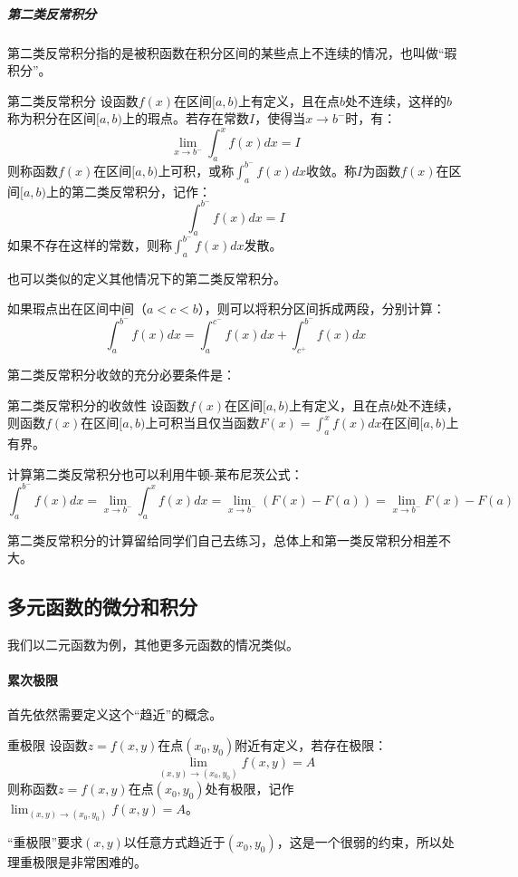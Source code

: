\subparagraph{第二类反常积分}

第二类反常积分指的是被积函数在积分区间的某些点上不连续的情况，也叫做“瑕积分”。
\begin{definition}{第二类反常积分}{}
    设函数$f(x)$在区间$[a, b)$上有定义，且在点$b$处不连续，这样的$b$称为积分在区间$[a, b)$上的瑕点。若存在常数$I$，使得当$x \to b^-$时，有：
    \begin{equation}
        \lim_{x \to b^-} \int_a^x f(x) dx = I
    \end{equation}
    则称函数$f(x)$在区间$[a, b)$上可积，或称$\int_a^{b^-} f(x) dx$收敛。称$I$为函数$f(x)$在区间$[a, b)$上的第二类反常积分，记作：
    \begin{equation}
        \int_a^{b^-} f(x) dx = I
    \end{equation}
    如果不存在这样的常数，则称$\int_a^{b^-} f(x) dx$发散。
\end{definition}
也可以类似的定义其他情况下的第二类反常积分。

如果瑕点出在区间中间（$a < c < b$），则可以将积分区间拆成两段，分别计算：
\begin{equation}
    \int_a^{b^-} f(x) dx = \int_a^{c^-} f(x) dx + \int_{c^+}^{b^-} f(x) dx
\end{equation}

第二类反常积分收敛的充分必要条件是：
\begin{theorem}{第二类反常积分的收敛性}{}
    设函数$f(x)$在区间$[a, b)$上有定义，且在点$b$处不连续，则函数$f(x)$在区间$[a, b)$上可积当且仅当函数$F(x) = \int_a^x f(x) dx$在区间$[a, b)$上有界。
\end{theorem}

计算第二类反常积分也可以利用牛顿-莱布尼茨公式：
\begin{equation}
    \int_a^{b^-} f(x) dx = \lim_{x \to b^-} \int_a^x f(x) dx = \lim_{x \to b^-} (F(x) - F(a)) = \lim_{x \to b^-} F(x) - F(a)
\end{equation}

第二类反常积分的计算留给同学们自己去练习，总体上和第一类反常积分相差不大。

\subsection{多元函数的微分和积分}

我们以二元函数为例，其他更多元函数的情况类似。

\paragraph{累次极限} 首先依然需要定义这个“趋近”的概念。
\begin{definition}{重极限}{}
设函数$z = f(x, y)$在点$(x_0, y_0)$附近有定义，若存在极限：
\begin{equation}
    \lim_{(x, y) \to (x_0, y_0)} f(x, y) = A
\end{equation}
则称函数$z = f(x, y)$在点$(x_0, y_0)$处有极限，记作$\lim_{(x, y) \to (x_0, y_0)} f(x, y) = A$。
\end{definition}
“重极限”要求$(x, y)$以任意方式趋近于$(x_0, y_0)$，这是一个很弱的约束，所以处理重极限是非常困难的。

